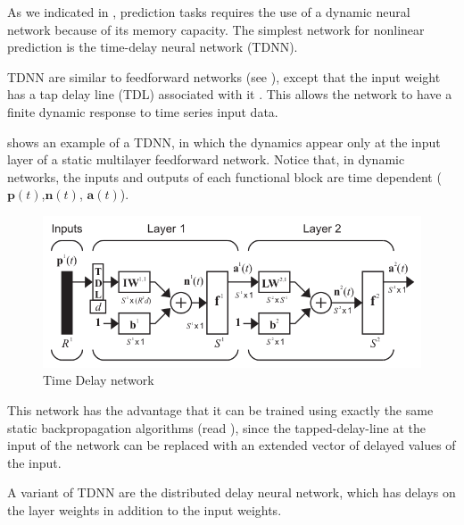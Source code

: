 
\label{subsec:ANN:TDNN}

As we indicated in , prediction tasks requires the use of a dynamic neural network because of its memory capacity. The simplest network for nonlinear prediction is the time-delay neural network (TDNN).

TDNN are similar to feedforward networks (see ), except that the input weight has a tap delay line (TDL) associated with it \cite{dimith3neural}. This allows the network to have a finite dynamic response to time series input data. 

 shows an example of a TDNN, in which the dynamics appear only at the input layer of a static multilayer feedforward network. Notice that, in dynamic networks, the inputs and outputs of each functional block are time dependent ($\mathbf{p}(t)$,$\mathbf{n}(t)$, $\mathbf{a}(t)$).

\begin{figure}[!ht]
\centering
\includegraphics[width=\textwidth]{images/tdnn.png}
\caption{Time Delay network}
\label{fig:tdnn}
\end{figure}

This network has the advantage that it can be trained using exactly the same static backpropagation algorithms (read ),
since the tapped-delay-line at the input of the network can be replaced with an extended vector of delayed values of the
input.

A variant of TDNN are the distributed delay neural network, which has delays on the layer weights in addition to the input weights.